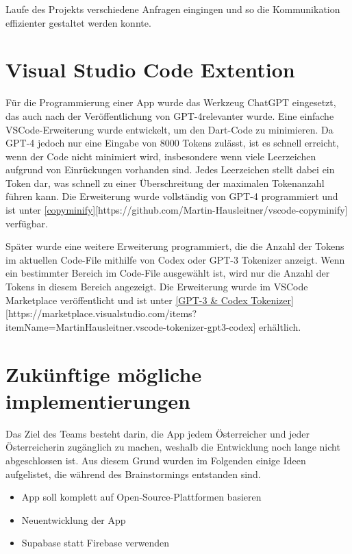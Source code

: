 Laufe des Projekts verschiedene Anfragen eingingen und so
die Kommunikation effizienter gestaltet werden konnte.


\section{Visual Studio Code Extention}

Für die Programmierung einer App wurde das Werkzeug ChatGPT
eingesetzt, das auch nach der Veröffentlichung von GPT-4relevanter wurde. Eine einfache VSCode-Erweiterung wurde
entwickelt, um den Dart-Code zu minimieren. Da GPT-4 jedoch
nur eine Eingabe von 8000 Tokens zulässt, ist es schnell
erreicht, wenn der Code nicht minimiert wird, insbesondere
wenn viele Leerzeichen aufgrund von Einrückungen vorhanden
sind. Jedes Leerzeichen stellt dabei ein Token dar, was
schnell zu einer Überschreitung der maximalen Tokenanzahl
führen kann. Die Erweiterung wurde vollständig von GPT-4
programmiert und ist unter \ref{copyminify}[https://github.com/Martin-Hausleitner/vscode-copyminify] verfügbar.

Später wurde eine weitere Erweiterung programmiert, die die Anzahl der Tokens im aktuellen Code-File mithilfe von Codex oder GPT-3 Tokenizer anzeigt. Wenn ein bestimmter Bereich im Code-File ausgewählt ist, wird nur die Anzahl der Tokens in diesem Bereich angezeigt. Die Erweiterung wurde im VSCode Marketplace veröffentlicht und ist unter \ref{GPT-3 & Codex Tokenizer}[https://marketplace.visualstudio.com/items?itemName=MartinHausleitner.vscode-tokenizer-gpt3-codex] erhältlich.



\section{Zukünftige mögliche implementierungen}
Das Ziel des Teams besteht darin, die App jedem Österreicher und jeder Österreicherin zugänglich zu machen, weshalb die Entwicklung noch lange nicht abgeschlossen ist. Aus diesem Grund wurden im Folgenden einige Ideen aufgelistet, die während des Brainstormings entstanden sind.


\begin{itemize}
  \item App soll komplett auf Open-Source-Plattformen basieren
  \item Neuentwicklung der App
  \item Supabase statt Firebase verwenden
\end{itemize}

